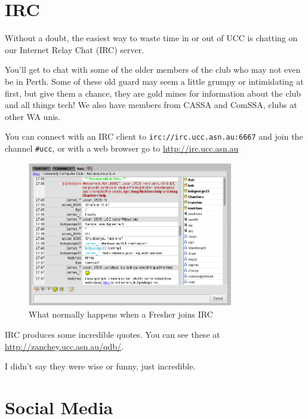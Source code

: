 \section{IRC}


\begin{mdframed}
Without a doubt, the easiest way to waste time in or out of UCC 
is chatting on our Internet Relay Chat (IRC) server. 

You'll get to chat with some of the older members of the club who 
may not even be in Perth. Some of these old guard may seem a 
little grumpy or intimidating at first, but give them a chance, they 
are gold mines for information about the club and all things tech! 
We also have members from CASSA and ComSSA, clubs at other WA unis. 

You can connect with an IRC client to \texttt{irc://irc.ucc.asn.au:6667} 
and join the channel \texttt{\#ucc}, or with a web browser go to 
\url{http://irc.ucc.asn.au}

\begin{figure}[H]
	\centering
	\includegraphics[width=0.8\textwidth]{figures/webirc.png}
	\caption{What normally happens when a Fresher joins IRC}
	\label{webirc.jpg}
\end{figure}

IRC produces some incredible quotes. You can see these at \url{http://zanchey.ucc.asn.au/qdb/}.

I didn't say they were wise or funny, just incredible.

\end{mdframed}

\section{Social Media}

